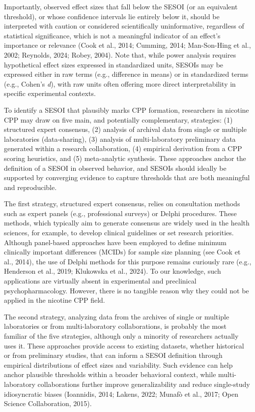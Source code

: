 \documentclass[authordate, meta, issue]{jote-new-article}
\begin{document}
	Importantly, observed effect sizes that fall below the SESOI (or an equivalent threshold), or whose confidence intervals lie entirely below it, should be interpreted with caution or considered scientifically uninformative, regardless of statistical significance, which is not a meaningful indicator of an effect's importance or relevance (Cook et al., 2014; Cumming, 2014; Man-Son-Hing et al., 2002; Reynolds, 2024; Robey, 2004). Note that, while power analysis requires hypothetical effect sizes expressed in standardized units, SESOIs may be expressed either in raw terms (e.g., difference in means) or in standardized terms (e.g., Cohen's \emph{d}), with raw units often offering more direct interpretability in specific experimental contexts.



	To identify a SESOI that plausibly marks CPP formation, researchers in nicotine CPP may draw on five main, and potentially complementary, strategies: (1) structured expert consensus, (2) analysis of archival data from single or multiple laboratories (data-sharing), (3) analysis of multi-laboratory preliminary data generated within a research collaboration, (4) empirical derivation from a CPP scoring heuristics, and (5) meta-analytic synthesis. These approaches anchor the definition of a SESOI in observed behavior, and SESOIs should ideally be supported by converging evidence to capture thresholds that are both meaningful and reproducible.



	The first strategy, structured expert consensus, relies on consultation methods such as expert panels (e.g., professional surveys) or Delphi procedures. These methods, which typically aim to generate consensus are widely used in the health sciences, for example, to develop clinical guidelines or set research priorities. Although panel-based approaches have been employed to define minimum clinically important differences (MCIDs) for sample size planning (see Cook et al., 2014), the use of Delphi methods for this purpose remains curiously rare (e.g., Henderson et al., 2019; Klukowska et al., 2024). To our knowledge, such applications are virtually absent in experimental and preclinical psychopharmacology. However, there is no tangible reason why they could not be applied in the nicotine CPP field.



	The second strategy, analyzing data from the archives of single or multiple laboratories or from multi-laboratory collaborations, is probably the most familiar of the five strategies, although only a minority of researchers actually uses it. These approaches provide access to existing datasets, whether historical or from preliminary studies, that can inform a SESOI definition through empirical distributions of effect sizes and variability. Such evidence can help anchor plausible thresholds within a broader behavioral context, while multi-laboratory collaborations further improve generalizability and reduce single-study idiosyncratic biases (Ioannidis, 2014; Lakens, 2022; Munafò et al., 2017; Open Science Collaboration, 2015).
\end{document}
